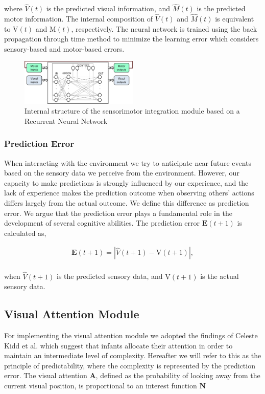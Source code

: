 \documentclass[conference]{IEEEtran}
\begin{document}
where \(\hat{V}(t)\) is the predicted visual information, and  \(\hat{M}(t)\) is the predicted motor information. The internal composition of \(\hat{V}(t)\) and \(\hat{M}(t)\) is equivalent to \(\text{V}(t)\) and \(\text{M}(t)\), respectively. The neural network is trained using the back propagation through time method to minimize the learning error which considers sensory-based and motor-based errors.

\begin{figure}[!t]
\centering
\includegraphics[width=0.5\textwidth,natwidth=700,natheight=450]{Figure4.png}
\caption{Internal structure of the sensorimotor integration module based on a Recurrent Neural Network}
\label{NeualNet}
\end{figure}

\subsubsection{Prediction Error}
When interacting with the environment we try to anticipate near future events based on the sensory data we perceive from the environment. However, our capacity to make predictions is strongly influenced by our experience, and the lack of experience makes the prediction outcome when observing others' actions differs largely from the actual outcome. We define this difference as prediction error. We argue that the prediction error plays a fundamental role in the development of several cognitive abilities. The prediction error \(\textbf{E}(t+1)\) is calculated as,

\begin{equation}
\begin{split}
	\textbf{E}(t+1)=|\hat{V}(t+1)-\text{V}(t+1)|,\\
\end{split}
\end{equation}

when \(\hat{V}(t+1)\)  is the predicted sensory data, and \(\text{V}(t+1)\) is the actual sensory data.

\subsection{Visual Attention Module}
For implementing the visual attention module we adopted the findings of Celeste Kidd et al. \cite{kidd2012goldilocks} which suggest that infants allocate their attention in order to maintain an intermediate level of complexity. Hereafter we will refer to this as the principle of predictability, where the complexity is represented by the prediction error. The visual attention \(\textbf{A}\), defined as the probability of looking away from the current visual position, is proportional to an interest function \(\textbf{N}\) 
\end{document}
